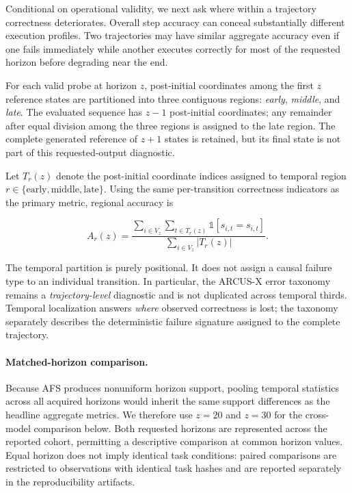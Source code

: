 \documentclass{article}
\begin{document}
Conditional on operational validity, we next ask where within a trajectory
correctness deteriorates. Overall step accuracy can conceal substantially
different execution profiles. Two trajectories may have similar aggregate
accuracy even if one fails immediately while another executes correctly for
most of the requested horizon before degrading near the end.

For each valid probe at horizon $z$, post-initial coordinates among the first
$z$ reference states are partitioned into three contiguous regions:
\emph{early}, \emph{middle}, and \emph{late}. The evaluated sequence has
$z-1$ post-initial coordinates; any remainder after equal division among the
three regions is assigned to the late region. The complete generated reference
of $z+1$ states is retained, but its final state is not part of this
requested-output diagnostic.

Let $T_r(z)$ denote the post-initial coordinate indices assigned to temporal region
$r \in \{\mathrm{early},\mathrm{middle},\mathrm{late}\}$. Using the same
per-transition correctness indicators as the primary metric, regional accuracy
is

\begin{equation}
    A_r(z)
    =
    \frac{
        \displaystyle
        \sum_{i \in V_z}
        \sum_{t \in T_r(z)}
        \mathbb{1}
        \left[
            \hat{s}_{i,t}=s_{i,t}
        \right]
    }{
        \displaystyle
        \sum_{i \in V_z}
        |T_r(z)|
    }.
    \label{eq:temporal_accuracy}
\end{equation}

The temporal partition is purely positional. It does not assign a causal
failure type to an individual transition. In particular, the ARCUS-X error
taxonomy remains a \emph{trajectory-level} diagnostic and is not duplicated
across temporal thirds. Temporal localization answers \emph{where} observed
correctness is lost; the taxonomy separately describes the deterministic
failure signature assigned to the complete trajectory.

\paragraph{Matched-horizon comparison.}
Because AFS produces nonuniform horizon support, pooling temporal statistics
across all acquired horizons would inherit the same support differences as the
headline aggregate metrics. We therefore use $z=20$ and $z=30$ for the
cross-model comparison below. Both requested horizons are represented across the reported cohort, permitting a descriptive comparison at common horizon values. Equal horizon does not imply identical task conditions: paired comparisons are restricted to observations with identical task hashes and are reported separately in the reproducibility artifacts.
\end{document}
